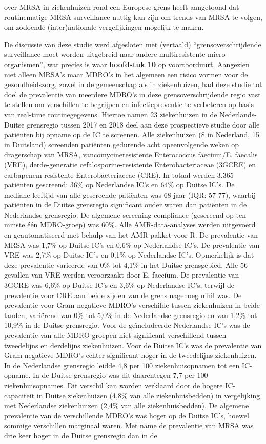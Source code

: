 \documentclass[
]{book}
\begin{document}
over MRSA in ziekenhuizen rond een Europese grens heeft aangetoond dat routinematige MRSA-surveillance nuttig kan zijn om trends van MRSA te volgen, om zodoende (inter)nationale vergelijkingen mogelijk te maken.

De discussie van deze studie werd afgesloten met (vertaald) ``grensoverschrijdende surveillance moet worden uitgebreid naar andere multiresistente micro-organismen'', wat precies is waar \textbf{hoofdstuk 10} op voortborduurt. Aangezien niet alleen MRSA's maar MDRO's in het algemeen een risico vormen voor de gezondheidszorg, zowel in de gemeenschap als in ziekenhuizen, had deze studie tot doel de prevalentie van meerdere MDRO's in deze grensoverschrijdende regio vast te stellen om verschillen te begrijpen en infectiepreventie te verbeteren op basis van real-time routinegegevens. Hiertoe namen 23 ziekenhuizen in de Nederlands-Duitse grensregio tussen 2017 en 2018 deel aan deze prospectieve studie door alle patiënten bij opname op de IC te screenen. Alle ziekenhuizen (8 in Nederland, 15 in Duitsland) screenden patiënten gedurende acht opeenvolgende weken op dragerschap van MRSA, vancomycineresistente Enterococcus faecium/E. faecalis (VRE), derde-generatie cefalosporine-resistente Enterobacteriaceae (3GCRE) en carbapenem-resistente Enterobacteriaceae (CRE). In totaal werden 3.365 patiënten gescreend: 36\% op Nederlandse IC's en 64\% op Duitse IC's. De mediane leeftijd van alle gescreende patiënten was 68 jaar (IQR: 57-77), waarbij patiënten in de Duitse grensregio significant ouder waren dan patiënten in de Nederlandse grensregio. De algemene screening compliance (gescreend op ten minste één MDRO-groep) was 60\%. Alle AMR-data-analyses werden uitgevoerd en geautomatiseerd met behulp van het AMR-pakket voor R. De prevalentie van MRSA was 1,7\% op Duitse IC's en 0,6\% op Nederlandse IC's. De prevalentie van VRE was 2,7\% op Duitse IC's en 0,1\% op Nederlandse IC's. Opmerkelijk is dat deze prevalentie varieerde van 0\% tot 4,1\% in het Duitse grensgebied. Alle 56 gevallen van VRE werden veroorzaakt door E. faecium. De prevalentie van 3GCRE was 6,6\% op Duitse IC's en 3,6\% op Nederlandse IC's, terwijl de prevalentie voor CRE aan beide zijden van de grens nagenoeg nihil was. De prevalentie voor Gram-negatieve MDRO's verschilde tussen ziekenhuizen in beide landen, variërend van 0\% tot 5,0\% in de Nederlandse grensregio en van 1,2\% tot 10,9\% in de Duitse grensregio. Voor de geïncludeerde Nederlandse IC's was de prevalentie van alle MDRO-groepen niet significant verschillend tussen tweedelijns en derdelijns ziekenhuizen. Voor de Duitse IC's was de prevalentie van Gram-negatieve MDRO's echter significant hoger in de tweedelijns ziekenhuizen. In de Nederlandse grensregio leidde 4,8 per 100 ziekenhuisopnamen tot een IC-opname. In de Duitse grensregio was dit daarentegen 7,7 per 100 ziekenhuisopnames. Dit verschil kan worden verklaard door de hogere IC-capaciteit in Duitse ziekenhuizen (4,8\% van alle ziekenhuisbedden) in vergelijking met Nederlandse ziekenhuizen (2,4\% van alle ziekenhuisbedden). De algemene prevalentie van de verschillende MDRO's was hoger op de Duitse IC's, hoewel sommige verschillen marginaal waren. Met name de prevalentie van MRSA was drie keer hoger in de Duitse grensregio dan in de 
\end{document}
